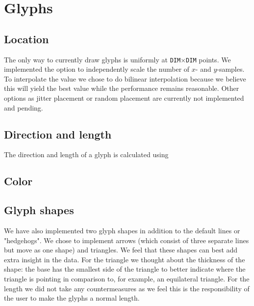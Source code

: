 \section{Glyphs}
	\label{sec:glyphs}
	\subsection*{Location}
		The only way to currently draw glyphs is uniformly at \texttt{DIM}$\times$\texttt{DIM} points.
		We implemented the option to independently scale the number of $x$- and $y$-samples.
		To interpolate the value we chose to do bilinear interpolation because we believe this will yield the best value while the performance remains reasonable.
		Other options as jitter placement or random placement are currently not implemented and pending. 

	\subsection*{Direction and length}
		The direction and length of a glyph is calculated using 
	
	\subsection*{Color}

	\subsection*{Glyph shapes}
		We have also implemented two glyph shapes in addition to the default lines or "hedgehogs".
		We chose to implement arrows (which consist of three separate lines but move as one shape) and triangles.
		We feel that these shapes can best add extra insight in the data.
		For the triangle we thought about the thickness of the shape: the base has the smallest side of the triangle to better indicate where the triangle is pointing in comparison to, for example, an equilateral triangle.
		For the length we did not take any countermeasures as we feel this is the responsibility of the user to make the glyphs a normal length. 
\clearpage